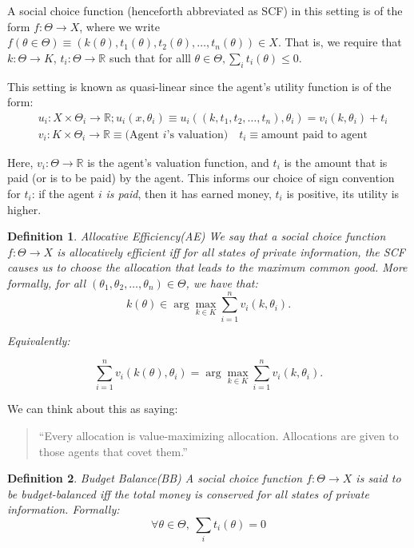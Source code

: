 \documentclass[10pt,a4paper]{article}
\newtheorem{definition}{Definition}
\newcommand{\R}{\ensuremath{\mathbb R}}
\begin{document}
A social choice function (henceforth abbreviated as SCF) in this setting
is of the form $f: \Theta \rightarrow X$, where we write 
$f(\theta \in \Theta) \equiv (k(\theta), t_1(\theta), t_2(\theta), \dots, t_n(\theta)) \in X$.
That is, we require that $k: \Theta \rightarrow K$, $t_i: \Theta \rightarrow \R$
such that for alll $\theta \in \Theta, \sum_i t_i(\theta) \leq 0$.

This setting is known as quasi-linear since the agent's utility function
is of the form:
\begin{align*}
	&u_i: X \times \Theta_i \rightarrow \R; 
	u_i(x, \theta_i) \equiv u_i((k, t_1, t_2, \dots, t_n), \theta_i) = v_i(k, \theta_i) + t_i \\
	&v_i: K \times \Theta_i \rightarrow \R \equiv \text{(Agent $i$'s valuation)} \quad t_i \equiv \text{amount paid to agent} 
\end{align*}

Here, $v_i : \Theta \rightarrow \R$ is the agent's valuation function, and $t_i$
is the amount that is paid (or is to be paid) by the agent. This informs
our choice of sign convention for $t_i$: if the agent $i$ \emph{is paid}, then
it has earned money, $t_i$ is positive, its utility is higher. 

\begin{definition}{Allocative Efficiency(AE)}
We say that a social choice function $f: \Theta \rightarrow X$
is allocatively efficient iff for all states of private information,
the SCF causes us to choose the allocation that leads to the \emph{maximum common good}.
More formally,  for all $(\theta_1, \theta_2, \dots, \theta_n) \in \Theta$, we have that:
\begin{equation}
    k(\theta) \in \arg \max_{k \in K} \sum_{i=1}^n v_i(k, \theta_i).
\end{equation}

Equivalently:

$$
\sum_{i=1}^n v_i(k(\theta), \theta_i) = \arg \max_{k \in K} \sum_{i=1}^n v_i(k, \theta_i).
$$
\end{definition}


We can think about this as saying:
\begin{quote}
``Every allocation is value-maximizing allocation. Allocations are given to
those agents that covet them.''
\end{quote}

\begin{definition}{Budget Balance(BB)}
A social choice function $f: \Theta \rightarrow X$ is said to be
\emph{budget-balanced} iff the total money is conserved for all states
of private information. Formally:
\begin{equation}
\forall \theta \in \Theta, ~ \sum_i t_i(\theta) = 0
\end{equation}
\end{definition}
\end{document}
